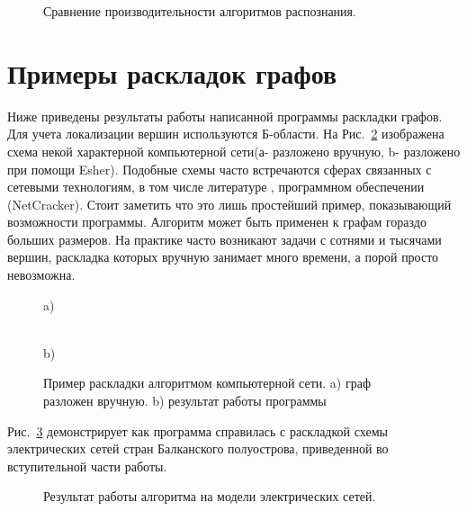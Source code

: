\documentclass[a4paper,12pt]{report}
\begin{document}
\begin{figure}[h!]
\caption{Сравнение производительности алгоритмов распознания.}
\label{ris:hist}
\end{figure} 

\section{Примеры раскладок графов}

Ниже приведены результаты работы написанной программы раскладки графов. Для учета локализации вершин используются Б-области. На Рис.~\ref{ris:net} изображена схема некой характерной компьютерной сети(а- разложено вручную, b- разложено при помощи Esher). Подобные схемы часто встречаются сферах связанных с сетевыми технологиям, в том числе литературе \cite{networks}, программном обеспечении (NetCracker). Стоит заметить что это лишь простейший пример, показывающий возможности программы. Алгоритм может быть применен к графам гораздо больших размеров. На практике часто возникают задачи с сотнями и тысячами вершин, раскладка которых вручную занимает много времени, а порой просто невозможна. 

\begin{figure}[h!]
\begin{minipage}[h]{1.\linewidth}
 a) \\
\end{minipage}
\hfill
\begin{minipage}[h]{1.\linewidth}
 \\b)
\end{minipage}
\caption{Пример раскладки алгоритмом компьютерной сети. a) граф разложен вручную. b) результат работы программы}
\label{ris:net}
\end{figure}

Рис.~\ref{ris:euro} демонстрирует как программа справилась с раскладкой схемы электрических сетей стран Балканского полуострова, приведенной во вступительной части работы.

\begin{figure}[h!]
\caption{Результат работы алгоритма на модели электрических сетей.}
\label{ris:euro}
\end{figure} 
\end{document}
